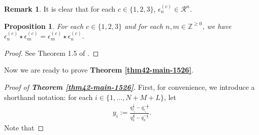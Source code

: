 \documentclass[12pt,reqno,a4paper]{amsart}
\newcommand{\cals}[1]{\mathcal{#1}}
\newcommand{\bb}[1]{\mathbb{#1}}
\numberwithin{equation}{section}
\newtheorem{prop}[thm]{Proposition}
\theoremstyle{definition}
\newtheorem{rem}[thm]{Remark}
\begin{document}
\begin{rem}
It is clear that for each $c \in \{1,2,3\}$, $\epsilon^{(c)}_n \in \cals{R}^n$. 
\end{rem}

\begin{prop}
\label{prop46-1604-5aug}
For each $c \in \{1,2,3\}$ and for each $n, m \in \bb{Z}^{\geq 0}$, we have $\epsilon^{(c)}_{n} \star \epsilon^{(c)}_{m} = \epsilon^{(c)}_{m} \star \epsilon^{(c)}_{n}$. 
\end{prop}
\begin{proof}
See Theorem 1.5 of \cite{FHHSY-comm}. 
\end{proof}

Now we are ready to prove \textbf{Theorem \ref{thm42-main-1526}}. 

\begin{proof}[Proof of \textbf{Theorem \ref{thm42-main-1526}}]
First, for convenience, we introduce a shorthand notation: for each $i \in \{1,\dots,N+M+L\}$, let 
\begin{align}
	y_i := 
	\frac{
		q_{c_i}^{\frac{1}{2}} - q_{c_i}^{-\frac{1}{2}}
	}{
		q_{3}^{\frac{1}{2}} - q_{3}^{-\frac{1}{2}}
	}. 
\end{align}
Note that 


\end{proof}
\end{document}
